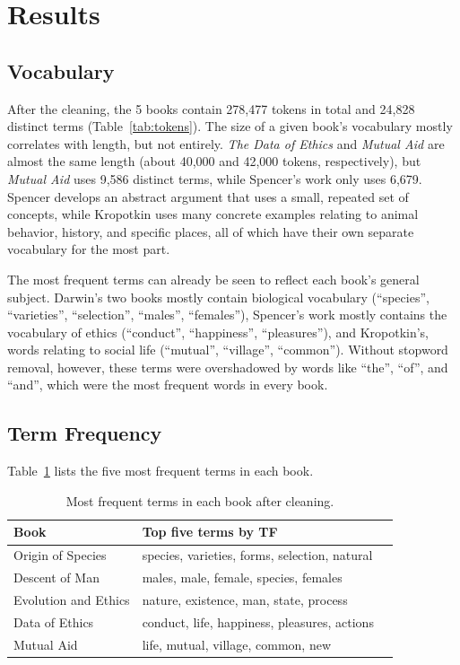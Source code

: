 \documentclass[11pt]{article}
\begin{document}
\section{Results}
\label{sec:results}

\subsection{Vocabulary}

After the cleaning, the 5 books contain 278,477 tokens in total and 24,828 distinct terms (Table~\ref{tab:tokens}).
The size of a given book's vocabulary mostly correlates with length, but not entirely.
\emph{The Data of Ethics} and \emph{Mutual Aid} are almost the same length (about 40,000 and 42,000 tokens, respectively), but \emph{Mutual Aid} uses 9,586 distinct terms, while Spencer's work only uses 6,679.
Spencer develops an abstract argument that uses a small, repeated set of concepts, while Kropotkin uses many concrete examples relating to animal behavior, history, and specific places, all of which have their own separate vocabulary for the most part.

The most frequent terms can already be seen to reflect each book's general subject.
Darwin's two books mostly contain biological vocabulary (``species'', ``varieties'', ``selection'', ``males'', ``females''), Spencer's work mostly contains the vocabulary of ethics (``conduct'', ``happiness'', ``pleasures''), and Kropotkin's, words relating to social life (``mutual'', ``village'', ``common'').
Without stopword removal, however, these terms were overshadowed by words like ``the'', ``of'', and ``and'', which were the most frequent words in every book.

\subsection{Term Frequency}

Table~\ref{tab:top-tf} lists the five most frequent terms in each book.

\begin{table}[H]
    \centering
    \begin{tabular}{lll}
        \toprule
        Book & Top five terms by TF \\
        \midrule
        Origin of Species    & species, varieties, forms, selection, natural \\
        Descent of Man       & males, male, female, species, females \\
        Evolution and Ethics & nature, existence, man, state, process \\
        Data of Ethics       & conduct, life, happiness, pleasures, actions \\
        Mutual Aid           & life, mutual, village, common, new \\
        \bottomrule
    \end{tabular}
    \caption{Most frequent terms in each book after cleaning.}
    \label{tab:top-tf}
\end{table}
\end{document}
